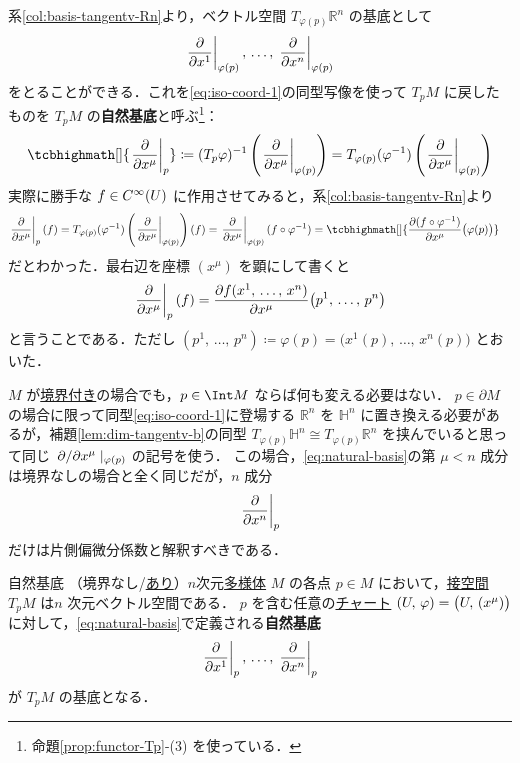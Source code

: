 \documentclass[geometry_main]{subfiles}
\begin{document}
系\ref{col:basis-tangentv-Rn}より，ベクトル空間 $T_{\varphi(p)} \mathbb{R}^n$ の基底として
\begin{align}
	\eval{\pdv{}{x^1}}_{\varphi(p)},\, \dots ,\, \eval{\pdv{}{x^n}}_{\varphi(p)}
\end{align}
をとることができる．これを\eqref{eq:iso-coord-1}の同型写像を使って $T_p M$ に戻したものを $T_p M$ の\textbf{自然基底}と呼ぶ\footnote{命題\ref{prop:functor-Tp}-(3) を使っている．}：
\begin{align}
	\label{eq:natural-basis}
	\tcbhighmath[]{\eval{\pdv{}{x^\mu}}_{p}} \coloneqq (T_p \varphi)^{-1} \left( \eval{\pdv{}{x^\mu}}_{\varphi(p)} \right) = T_{\varphi (p)} (\varphi^{-1}) \left( \eval{\pdv{}{x^\mu}}_{\varphi(p)} \right)
\end{align}
実際に勝手な $f \in C^\infty(U)$ に作用させてみると，系\ref{col:basis-tangentv-Rn}より
\begin{align}
	\eval{\pdv{}{x^\mu}}_{p} (f) &= T_{\varphi (p)} (\varphi^{-1}) \left( \eval{\pdv{}{x^\mu}}_{\varphi(p)} \right)(f) = \eval{\pdv{}{x^\mu}}_{\varphi(p)} (f \circ \varphi^{-1}) = \tcbhighmath[]{\pdv{(f\circ \varphi^{-1})}{x^\mu}()\bigl(\varphi (p)\bigr)}
\end{align}
だとわかった．最右辺を座標 $(x^\mu)$ を顕にして書くと
\begin{align}
	\eval{\pdv{}{x^\mu}}_{p} (f) = \pdv{f(x^1,\, \dots,\, x^n)}{x^\mu}() \bigl( p^1,\, \dots ,\, p^n \bigr)
\end{align}
と言うことである．ただし $(p^1,\, \dots,\, p^n) \coloneqq \varphi(p) = \bigl(x^1(p),\, \dots ,\, x^n(p) \bigr)$ とおいた．

$M$ が\hyperref[def:mani-with-boundary]{境界付き}の場合でも，$p \in \Int M$ ならば何も変える必要はない．
$p \in \partial M$ の場合に限って同型\eqref{eq:iso-coord-1}に登場する $\mathbb{R}^n$ を $\mathbb{H}^n$ に置き換える必要があるが，補題\ref{lem:dim-tangentv-b}の同型 $T_{\varphi(p)} \mathbb{H}^n \cong T_{\varphi(p)} \mathbb{R}^n$ を挟んでいると思って同じ $\pdv*{}{x^\mu}|_{\varphi(p)}$ の記号を使う．
この場合，\eqref{eq:natural-basis}の第 $\mu < n$ 成分は境界なしの場合と全く同じだが，$n$ 成分
\begin{align}
	\eval{\pdv{}{x^n}}_{p}
\end{align}
だけは片側偏微分係数と解釈すべきである．

\begin{myprop}[label=naturalbasis]{自然基底}
	（境界なし/\hyperref[def:mani-with-boundary]{あり}）$n$次元\hyperref[diffmani]{\cinfty 多様体} $M$ の各点 $p \in M$ において，\hyperref[def.tangentv]{接空間} $T_p M$ は$n$ 次元ベクトル空間である．
	$p$ を含む任意の\hyperref[diffmani]{\cinfty チャート} $(U,\, \varphi) = \bigl(U,\, (x^\mu)\bigr)$ に対して，\eqref{eq:natural-basis}で定義される\textbf{自然基底}
	\begin{align}
		\eval{\pdv{}{x^1}}_p,\, \dots ,\, \eval{\pdv{}{x^n}}_p
	\end{align}
	が $T_pM$ の基底となる．
\end{myprop}
\end{document}
